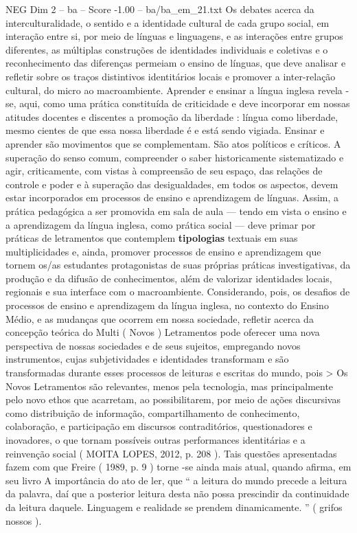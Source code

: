 \begin{textsample}{NEG Dim 2 – ba – Score -1.00 – ba/ba\_em\_21.txt}
Os debates acerca da interculturalidade, o sentido e a identidade cultural de cada grupo social, em interação entre si, por meio de línguas e linguagens, e as interações entre grupos diferentes, as múltiplas construções de identidades individuais e coletivas e o reconhecimento das diferenças permeiam o ensino de línguas, que deve analisar e refletir sobre os traços distintivos identitários locais e promover a inter-relação cultural, do micro ao macroambiente.
Aprender e ensinar a língua inglesa revela -se, aqui, como uma prática constituída de criticidade e deve incorporar em nossas atitudes docentes e discentes a promoção da liberdade : língua como liberdade, mesmo cientes de que essa nossa liberdade é e está sendo vigiada.
Ensinar e aprender são movimentos que se complementam.
São atos políticos e críticos.
A superação do senso comum, compreender o saber historicamente sistematizado e agir, criticamente, com vistas à compreensão de seu espaço, das relações de controle e poder e à superação das desigualdades, em todos os aspectos, devem estar incorporados em processos de ensino e aprendizagem de línguas.
Assim, a prática pedagógica a ser promovida em sala de aula — tendo em vista o ensino e a aprendizagem da língua inglesa, como prática social — deve primar por práticas de letramentos que contemplem \textbf{tipologias} textuais em suas multiplicidades e, ainda, promover processos de ensino e aprendizagem que tornem os/as estudantes protagonistas de suas próprias práticas investigativas, da produção e da difusão de conhecimentos, além de valorizar identidades locais, regionais e sua interface com o macroambiente.
Considerando, pois, os desafios de processos de ensino e aprendizagem da língua inglesa, no contexto do Ensino Médio, e as mudanças que ocorrem em nossa sociedade, refletir acerca da concepção teórica do Multi ( Novos ) Letramentos pode oferecer uma nova perspectiva de nossas sociedades e de seus sujeitos, empregando novos instrumentos, cujas subjetividades e identidades transformam e são transformadas durante esses processos de leituras e escritas do mundo, pois > Os Novos Letramentos são relevantes, menos pela tecnologia, mas principalmente pelo novo ethos que acarretam, ao possibilitarem, por meio de ações discursivas como distribuição de informação, compartilhamento de conhecimento, colaboração, e participação em discursos contraditórios, questionadores e inovadores, o que tornam possíveis outras performances identitárias e a reinvenção social ( MOITA LOPES, 2012, p. 208 ).
Tais questões apresentadas fazem com que Freire ( 1989, p. 9 ) torne -se ainda mais atual, quando afirma, em seu livro A importância do ato de ler, que “ a leitura do mundo precede a leitura da palavra, daí que a posterior leitura desta não possa prescindir da continuidade da leitura daquele.
Linguagem e realidade se prendem dinamicamente. ” ( grifos nossos ).

\end{textsample}
